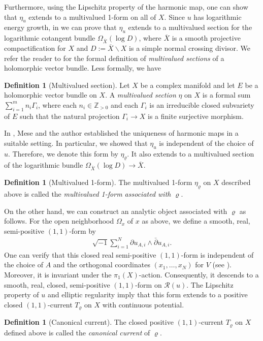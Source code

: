\documentclass[english]{amsproc}
\theoremstyle{plain}
\theoremstyle{definition}
\newtheorem{dfn}[thm]{Definition}
\theoremstyle{remark}
\theoremstyle{plain}
\numberwithin{equation}{thm} %
\begin{document}
%
Furthermore, using the Lipschitz property of the harmonic map, one can show that $\eta_u$ extends to a multivalued 1-form on all of $X$. Since $u$ has logarithmic energy growth, in \cite{BDDM} we can prove that  $\eta_u$ extends to a multivalued section for the logarithmic cotangent bundle $\Omega_{\overline{X}}(\log D)$, where $\overline{X}$ is a smooth projective compactification for $X$ and $D:=\overline{X}\backslash X$ is a simple normal crossing divisor.     We refer the reader to \cite[\S 3.1]{CDY22} for the formal definition of \emph{multivalued sections} of a holomorphic vector bundle. Less formally, we have
\begin{dfn}[Multivalued  section]\label{def:multivalued}
	Let $X$ be a complex manifold and let $E$ be a  holomorphic  vector bundle on $X$.  A \emph{multivalued section} $\eta$ on $X$ is   a formal sum $ \sum_{i=1}^{m}n_i\Gamma_i$, where each $n_i\in \mathbb{Z}_{>0}$ and each $\Gamma_i$  is an irreducible closed subvariety of $E$ such that  
	the natural projection $\Gamma_i\to X$ is a finite surjective morphism.  
\end{dfn}
In \cite{DM24},  Mese and the author established the uniqueness of harmonic maps in a suitable setting. In particular, we showed that $\eta_u$ is independent of the choice of $u$. Therefore, we denote this form by $\eta_\varrho$.   It also extends to a multivalued section of the logarithmic bundle $\Omega_{\overline{X}}(\log D)\to \overline{X}$. 
\begin{dfn}[Multivalued 1-form]\label{def:multivaluedform}
	The multivalued 1-form $\eta_\varrho$ on $X$ described above is called the \emph{multivalued 1-form associated with $\varrho$}.
\end{dfn}
On the other hand, we can construct an analytic object associated with $\varrho$ as follows.   For the open neighborhood  $\Omega_x$ of $x$ as above, we define  a smooth, real, semi-positive $(1,1)$-form by
\begin{align}\label{eq:form}
	\sqrt{-1}\sum_{i=1}^{N}\partial u_{A,i} \wedge \bar{\partial} u_{A,i}.
\end{align}
One can verify that this closed real semi-positive $(1,1)$-form is independent of the choice of $A$ and the orthogonal coordinates $(x_1,\ldots,x_N)$ for $V$ (see \cite[\S 3]{DW24b}). Moreover, it is invariant under the $\pi_1(X)$-action. Consequently, it descends to a smooth, real, closed, semi-positive $(1,1)$-form on $\mathcal{R}(u)$. 
The Lipschitz property of $u$ and elliptic regularity imply  that this form extends to a positive closed $(1,1)$-current $T_{\varrho}$ on $X$ with continuous potential. 
\begin{dfn}[Canonical current]\label{def:canonical}
	The closed positive $(1,1)$-current $T_\varrho$ on $X$ defined above is called the \emph{canonical current} of $\varrho$.
\end{dfn}
\end{document}
